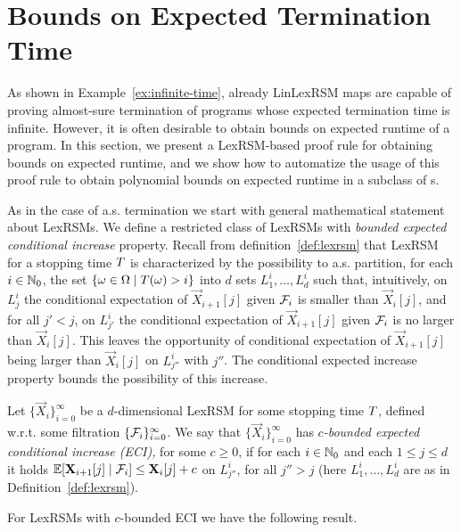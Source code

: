 \section{Bounds on Expected Termination Time}

As shown in Example~\ref{ex:infinite-time}, already LinLexRSM maps are capable 
of proving almost-sure termination of programs whose expected termination time 
is infinite. However, it is often desirable to obtain bounds on expected 
runtime of a program. In this section, we present a LexRSM-based proof rule for 
obtaining bounds on expected runtime, and we show how to automatize the usage 
of this proof rule to obtain polynomial bounds on expected runtime in a 
subclass of \PP{}s.

As in the case of a.s. termination we start with general mathematical statement 
about LexRSMs. We define a restricted class of LexRSMs with \emph{bounded 
expected conditional increase} property. Recall from 
definition~\ref{def:lexrsm} that 
LexRSM for a stopping time $T$ is characterized by the possibility to 
a.s. partition, for each $i\in \mathbb{N}_0$, the set $\{\omega\in \Omega\mid 
T(\omega)>i \}$ into $d$ sets $L^i_1,\dots,L^i_d$ such that, intuitively, 
on $L^i_j$ the conditional expectation of $\vec{X}_{i+1}[j]$ given $\mathcal{F}_i$ 
is smaller than $\vec{X}_i[j]$, and for all $j'<j$, on $L^i_{j'}$ the 
conditional expectation of $\vec{X}_{i+1}[j]$ given $\mathcal{F}_i$ 
is no larger than $\vec{X}_i[j]$. This leaves the opportunity of conditional 
expectation of $\vec{X}_{i+1}[j]$ being larger than $\vec{X}_i[j]$ on 
$L^i_{j''}$ with $j''$. The conditional expected increase property bounds the 
possibility of this increase.

\begin{definition}
Let $\{\vec{X}_{i}\}_{i=0}^{\infty}$ be a 
$d$-dimensional LexRSM for some stopping time $T$, defined w.r.t. some 
filtration $\{\mathcal{F}_i\}_{i=0}^{\infty}$. We say that 
$\{\vec{X}_{i}\}_{i=0}^{\infty}$ has \emph{$c$-bounded expected conditional 
increase (ECI),} for 
some $c\geq 0$, if for each $i\in \mathbb{N}_0 $ and each $1\leq j \leq d $ it holds 
$\mathbb{E}[\mathbf{X}_{i+1}[j]\mid \mathcal{F}_i]\leq \mathbf{X}_{i}[j]+c$ on $L^i_{j''}$, 
for all $j''>j$ 
(here $L^i_1,\dots,L^i_d$ are as in Definition~\ref{def:lexrsm}).
\end{definition}

For LexRSMs with $c$-bounded ECI we have the following result.

\begin{theorem}
\label{thm:runtime-bound}

\end{theorem}